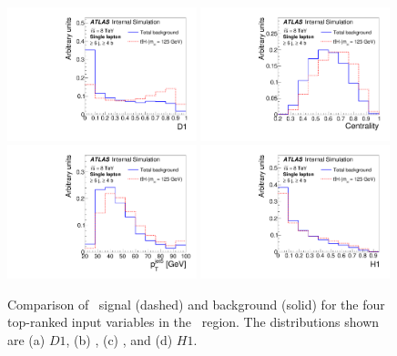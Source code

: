 \begin{figure}[tp]
\begin{center}
\includegraphics[width=0.49\textwidth]{Appendices/Figures_separation/ME_D1_6jincl_sep.pdf}
\includegraphics[width=0.49\textwidth]{Appendices/Figures_separation/cent_6jincl_sep.pdf}\\
\includegraphics[width=0.49\textwidth]{Appendices/Figures_separation/jet5_pt_6jincl_sep.pdf}
\includegraphics[width=0.49\textwidth]{Appendices/Figures_separation/H1_6jincl_sep.pdf}
\caption{Comparison of \tth\ signal (dashed) and background (solid) for the four top-ranked input variables 
in the \sixfour\ region.  The distributions shown are (a) $D1$, (b) \cent, (c) \ptjetfive, and (d) $H1$.
}
\label{fig:sepinput_lj_3} 
\end{center}
\end{figure}

